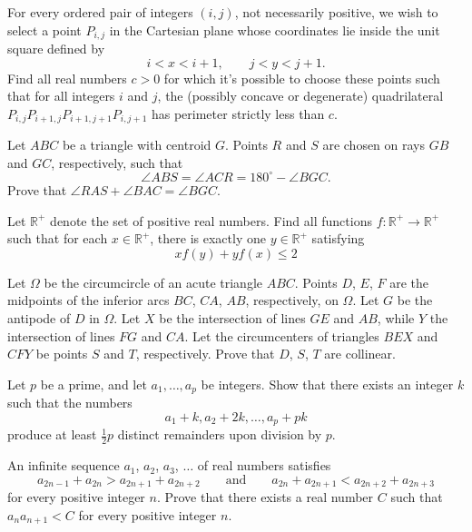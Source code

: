 \documentclass[11pt]{scrartcl}
\begin{document}
\begin{problem}[8209367948889736949]
For every ordered pair of integers $(i,j)$, not necessarily positive, we wish to select a point $P_{i,j}$ in the Cartesian plane whose coordinates lie inside the unit square defined by
\[ i < x < i+1, \qquad j < y < j+1. \]Find all real numbers $c > 0$ for which it's possible to choose these points such that for all integers $i$ and $j$, the (possibly concave or degenerate) quadrilateral $P_{i,j} P_{i+1,j} P_{i+1,j+1} P_{i,j+1}$ has perimeter strictly less than $c$.
\end{problem}
\begin{problem}[284109588966873]
	Let $ABC$ be a triangle with centroid $G$. Points $R$ and $S$ are chosen on rays $GB$ and $GC$, respectively, such that
\[ \angle ABS=\angle ACR=180^\circ-\angle BGC.\]Prove that $\angle RAS+\angle BAC=\angle BGC$.
\end{problem}
\begin{problem}[6558910862034852540]
Let $\mathbb{R}^+$ denote the set of positive real numbers. Find all functions $f: \mathbb{R}^+ \to \mathbb{R}^+$ such that for each $x \in \mathbb{R}^+$, there is exactly one $y \in \mathbb{R}^+$ satisfying$$xf(y)+yf(x) \leq 2$$
\end{problem}
\begin{problem}[607556370102952]
Let $\Omega$ be the circumcircle of an acute triangle $ABC$. Points $D$, $E$, $F$ are the midpoints of the inferior arcs $BC$, $CA$, $AB$, respectively, on $\Omega$. Let $G$ be the antipode of $D$ in $\Omega$. Let $X$ be the intersection of lines $GE$ and $AB$, while $Y$ the intersection of lines $FG$ and $CA$. Let the circumcenters of triangles $BEX$ and $CFY$ be points $S$ and $T$, respectively. Prove that $D$, $S$, $T$ are collinear.
\end{problem}
\begin{problem}[4278278843148290847]
	Let $p$ be a prime, and let $a_1, \dots, a_p$ be integers. Show that there exists an integer $k$ such that the numbers
\[a_1 + k, a_2 + 2k, \dots, a_p + pk\]produce at least $\tfrac{1}{2} p$ distinct remainders upon division by $p$.
\end{problem}
\begin{problem}[8126547357118301633]
An infinite sequence $a_1$, $a_2$, $a_3$, $\ldots$ of real numbers satisfies
\[
a_{2n-1} + a_{2n} > a_{2n+1} + a_{2n+2} \qquad \mbox{and} \qquad a_{2n} + a_{2n+1} < a_{2n+2} + a_{2n+3}
\]for every positive integer $n$. Prove that there exists a real number $C$ such that $a_{n} a_{n+1} < C$ for every positive integer $n$.
\end{problem}
\end{document}
